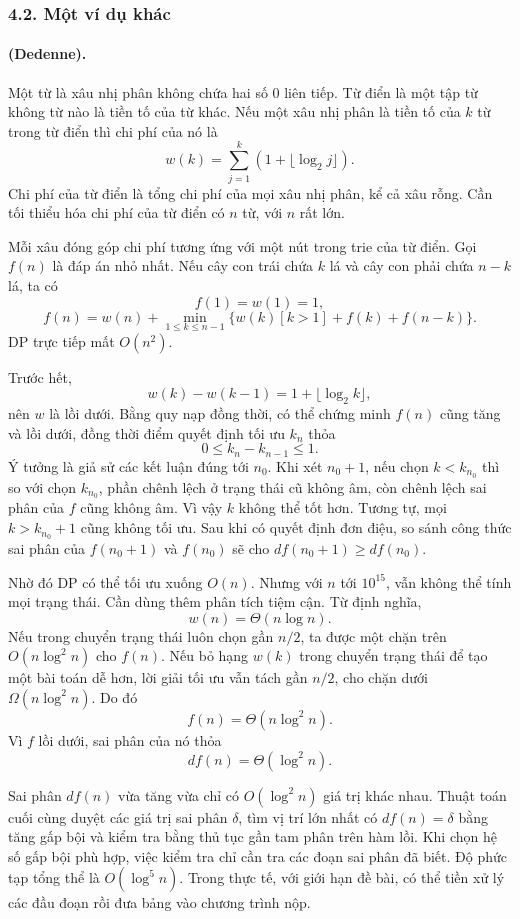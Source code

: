 \documentclass[11pt]{article}
\begin{document}
\subsubsection*{4.2. Một ví dụ khác}

\paragraph{ (Dedenne).}
Một từ là xâu nhị phân không chứa hai số $0$ liên tiếp. Từ điển là một tập từ
không từ nào là tiền tố của từ khác. Nếu một xâu nhị phân là tiền tố của $k$
từ trong từ điển thì chi phí của nó là
\[
  w(k)=\sum_{j=1}^k (1+\lfloor\log_2 j\rfloor).
\]
Chi phí của từ điển là tổng chi phí của mọi xâu nhị phân, kể cả xâu rỗng. Cần
tối thiểu hóa chi phí của từ điển có $n$ từ, với $n$ rất lớn.

Mỗi xâu đóng góp chi phí tương ứng với một nút trong trie của từ điển. Gọi
$f(n)$ là đáp án nhỏ nhất. Nếu cây con trái chứa $k$ lá và cây con phải chứa
$n-k$ lá, ta có
\[
  f(1)=w(1)=1,
\]
\[
  f(n)=w(n)+\min_{1\le k\le n-1}
  \{w(k)[k>1]+f(k)+f(n-k)\}.
\]
DP trực tiếp mất $O(n^2)$.

Trước hết,
\[
  w(k)-w(k-1)=1+\lfloor\log_2 k\rfloor,
\]
nên $w$ là lồi dưới. Bằng quy nạp đồng thời, có thể chứng minh $f(n)$ cũng
tăng và lồi dưới, đồng thời điểm quyết định tối ưu $k_n$ thỏa
\[
  0\le k_n-k_{n-1}\le 1.
\]
Ý tưởng là giả sử các kết luận đúng tới $n_0$. Khi xét $n_0+1$, nếu chọn
$k<k_{n_0}$ thì so với chọn $k_{n_0}$, phần chênh lệch ở trạng thái cũ không
âm, còn chênh lệch sai phân của $f$ cũng không âm. Vì vậy $k$ không thể tốt
hơn. Tương tự, mọi $k>k_{n_0}+1$ cũng không tối ưu. Sau khi có quyết định
đơn điệu, so sánh công thức sai phân của $f(n_0+1)$ và $f(n_0)$ sẽ cho
$df(n_0+1)\ge df(n_0)$.

Nhờ đó DP có thể tối ưu xuống $O(n)$. Nhưng với $n$ tới $10^{15}$, vẫn không
thể tính mọi trạng thái. Cần dùng thêm phân tích tiệm cận. Từ định nghĩa,
\[
  w(n)=\Theta(n\log n).
\]
Nếu trong chuyển trạng thái luôn chọn gần $n/2$, ta được một chặn trên
$O(n\log^2 n)$ cho $f(n)$. Nếu bỏ hạng $w(k)$ trong chuyển trạng thái để tạo
một bài toán dễ hơn, lời giải tối ưu vẫn tách gần $n/2$, cho chặn dưới
$\Omega(n\log^2 n)$. Do đó
\[
  f(n)=\Theta(n\log^2 n).
\]
Vì $f$ lồi dưới, sai phân của nó thỏa
\[
  df(n)=\Theta(\log^2 n).
\]

Sai phân $df(n)$ vừa tăng vừa chỉ có $O(\log^2 n)$ giá trị khác nhau. Thuật
toán cuối cùng duyệt các giá trị sai phân $\delta$, tìm vị trí lớn nhất có
$df(n)=\delta$ bằng tăng gấp bội và kiểm tra bằng thủ tục gần tam phân trên
hàm lồi. Khi chọn hệ số gấp bội phù hợp, việc kiểm tra chỉ cần tra các đoạn
sai phân đã biết. Độ phức tạp tổng thể là $O(\log^5 n)$. Trong thực tế, với
giới hạn đề bài, có thể tiền xử lý các đầu đoạn rồi đưa bảng vào chương trình
nộp.
\end{document}
